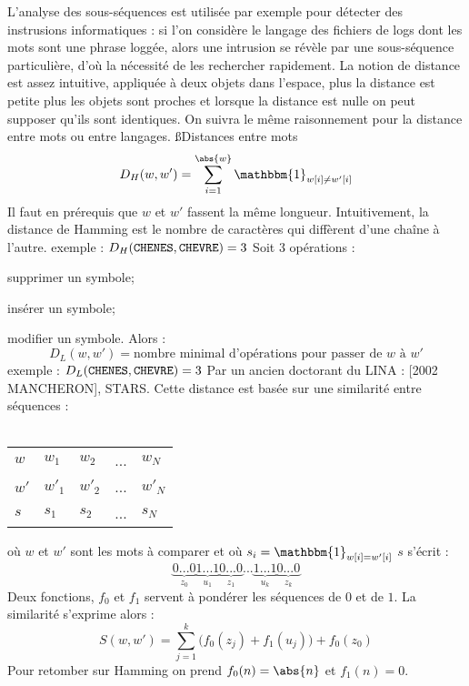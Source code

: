\documentclass[a4paper,11pt]{article}
\begin{document}
 \p L'analyse des sous-séquences est utilisée par exemple pour détecter des
 instrusions informatiques : si l'on considère le langage des fichiers de logs
 dont les mots sont une phrase loggée, alors une intrusion se révèle par une
 sous-séquence particulière, d'où la nécessité de les rechercher rapidement.
 La notion de distance est assez intuitive, appliquée à deux objets
 dans l'espace, plus la distance est petite plus les objets sont
 proches et lorsque la distance est nulle on peut supposer qu'ils sont
 identiques. On suivra le même raisonnement pour la distance entre
 mots ou entre langages.
 \ss{Distances entre mots}
  \[
  D_H(w, w') = \sum^{\abs{w}}_{i = 1} \mathbbm{1}_{w[i] \neq w'[i]}
  \]
  \p Il faut en prérequis que $w$ et $w'$ fassent la même longueur.
  Intuitivement, la distance de Hamming est le nombre de caractères qui
  diffèrent d'une chaîne à l'autre.
  \p exemple : $D_H(\texttt{CHENES},\texttt{CHEVRE})=3$
  \p Soit 3 opérations :\\
  \bi
   \item supprimer un symbole;
   \item insérer un symbole;
   \item modifier un symbole.
  \ei
  \p Alors :
  \[
  D_L(w, w') = \text{nombre minimal d'opérations pour passer de }w\text{ à }w'
  \]
  \p exemple : $D_L(\texttt{CHENES},\texttt{CHEVRE})=3$
  \p Par un ancien doctorant du LINA : [2002 MANCHERON], STARS.
  \p Cette distance est basée sur une similarité entre séquences :\\ \\
  \begin{tabular}{ l | l l l l }
   $w$  & $w_1$  & $w_2$  & ... & $w_N$  \\
   $w'$ & $w'_1$ & $w'_2$ & ... & $w'_N$ \\ \hline
   $s$  & $s_1$ & $s_2$ & ... & $s_N$ \\
  \end{tabular}
  \p où $w$ et $w'$ sont les mots à comparer et où
  $s_i=\mathbbm{1}_{w[i] = w'[i]}$
  \p $s$ s'écrit :
  \[
  \underbrace{0...0}_{z_0}\underbrace{1...1}_{u_1}\underbrace{0...0}_{z_1}
   ...\underbrace{1...1}_{u_k}\underbrace{0...0}_{z_k}
  \]
  \p Deux fonctions, $f_0$ et $f_1$ servent à pondérer les séquences de
  $0$ et de $1$. La similarité s'exprime alors :
  \[
  S(w, w') = \sum^k_{j = 1}\bigg(f_0(z_j) + f_1(u_j)\bigg) + f_0(z_0)
  \]
  \p Pour retomber sur Hamming on prend $f_0(n) = \abs{n}$ et $f_1(n) = 0$.
\end{document}
